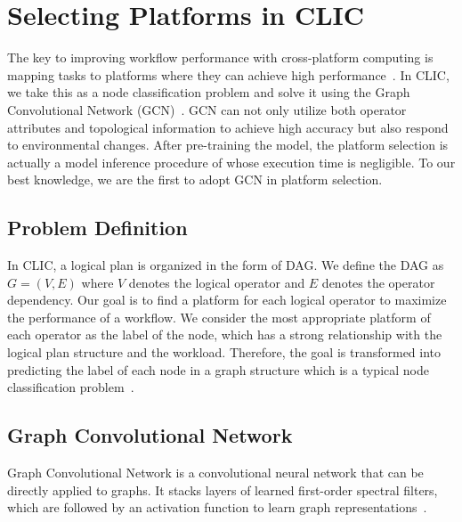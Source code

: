 
\section{Selecting Platforms in CLIC}
The key to improving workflow performance with cross-platform computing is mapping tasks to platforms where they can achieve high performance~\cite{sigmodblog}. In CLIC, we take this as a node classification problem and solve it using the Graph Convolutional Network (GCN)~\cite{kipf2016semi}. GCN can not only utilize both operator attributes and topological information to achieve high accuracy but also respond to environmental changes. After pre-training the model, the platform selection is actually a model inference procedure of 
whose execution time is negligible. To our best knowledge, we are the first to adopt GCN in platform selection.

\subsection{Problem Definition}
In CLIC, a logical plan is organized in the form of DAG. We define the DAG as $G = (V, E)$ where $V$ denotes the logical operator and $E$ denotes the operator dependency. Our goal is to find a platform for each logical operator to maximize the performance of a workflow. We consider the most appropriate platform of each operator as the label of the node, which has a strong relationship with the logical plan structure and the workload. Therefore, the goal is transformed into predicting the label of each node in a graph structure which is a typical node classification problem~\cite{bhagat2011node}. 

\subsection{Graph Convolutional Network}
Graph Convolutional Network is a convolutional neural network that can be directly applied to graphs. It stacks layers of learned first-order spectral filters, which are followed by an activation function to learn graph representations~\cite{wu2019simplifying}. 

